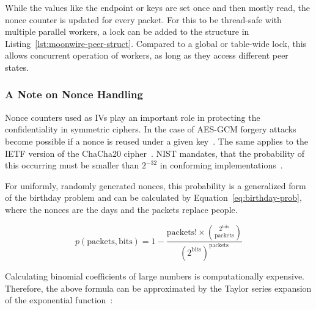 While the values like the endpoint or keys are set once and then mostly read, the nonce counter is updated for every packet. For this to be thread-safe with multiple parallel workers, a lock can be added to the structure in Listing~\ref{lst:moonwire-peer-struct}. Compared to a global or table-wide lock, this allows concurrent operation of workers, as long as they access different peer states.

%




\subsubsection{A Note on Nonce Handling}
Nonce counters used as IVs play an important role in protecting the confidentiality in symmetric ciphers. 
In the case of AES-GCM forgery attacks become possible if a nonce is reused under a given key~\cite{dworkin2007recommendation}. The same applies to the IETF version of the ChaCha20 cipher~\cite{TODO}.
NIST mandates, that the probability of this occurring must be smaller than $2^{-32}$ in conforming implementations~\cite{dworkin2007recommendation}.

For uniformly, randomly generated nonces, this probability is a generalized form of the birthday problem and can be calculated by Equation~\ref{eq:birthday-prob}, where the nonces are the days and the packets replace people.

\begin{equation}
p(\textrm{packets}, \textrm{bits}) = 1 - \frac{\textrm{packets}! \times \binom{2^\textrm{bits}}{\textrm{packets}}}{
	{(2^\textrm{bits})}^\textrm{packets}
}
\label{eq:birthday-prob}
\end{equation}

Calculating binomial coefficients of large numbers is computationally expensive. Therefore, the above formula can be approximated by the Taylor series expansion of the exponential function~\cite{TODO}:

